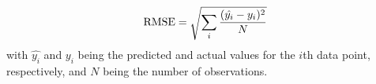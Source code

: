 $$\textnormal{RMSE}=\sqrt{\sum\limits_{i}\frac{(\hat{y_i}-y_i)^2}{N}}$$
with $\hat{y_i}$ and $y_i$ being the predicted and actual values for the $i$th data point, respectively, and $N$ being the number of observations.